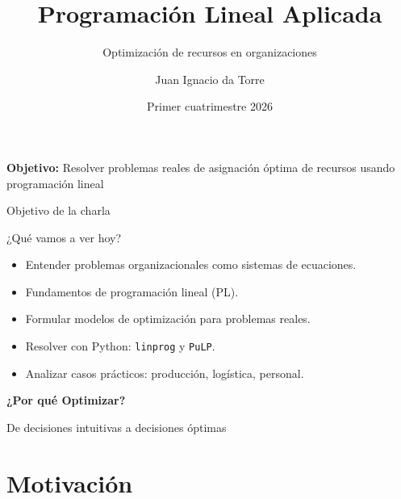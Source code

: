 \documentclass[aspectratio=169,10pt]{beamer}
\title{Programación Lineal Aplicada}
\subtitle{Optimización de recursos en organizaciones}
\author{Juan Ignacio da Torre}
\institute{
    Laboratorio de Métodos Cuantitativos Aplicados a la Gestión \\
    Universidad de Buenos Aires
}
\date{Primer cuatrimestre 2026}
\begin{document}
\begin{frame}
\titlepage
\vspace{-0.5cm}
\begin{center}
\textbf{Objetivo:} Resolver problemas reales de asignación óptima de recursos usando programación lineal
\end{center}
\end{frame}

\begin{frame}{Objetivo de la charla}
\begin{block}{¿Qué vamos a ver hoy?}
\begin{itemize}
    \item Entender problemas organizacionales como sistemas de ecuaciones.
    \item Fundamentos de programación lineal (PL).
    \item Formular modelos de optimización para problemas reales.
    \item Resolver con Python: \texttt{linprog} y \texttt{PuLP}.
    \item Analizar casos prácticos: producción, logística, personal.
\end{itemize}
\end{block}
\end{frame}

\begin{frame}
\begin{center}
\vspace{1.5cm}
\Huge \textbf{¿Por qué Optimizar?}

\vspace{0.5cm}
\Large De decisiones intuitivas a decisiones óptimas
\end{center}
\end{frame}

\section{Motivación}
\end{document}
